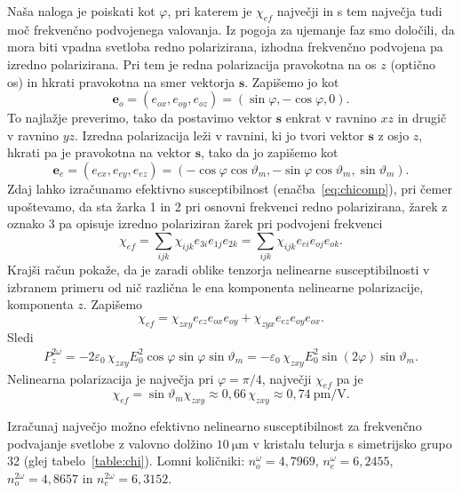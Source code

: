 Naša naloga je poiskati kot $\varphi$, pri katerem je 
$\chi_{ef}$ največji in s tem največja tudi moč frekvenčno podvojenega valovanja.
Iz pogoja za ujemanje faz smo določili, da mora biti vpadna svetloba redno polarizirana, 
izhodna frekvenčno podvojena pa izredno polarizirana. Pri tem je redna polarizacija pravokotna na 
os $z$ (optično os) in hkrati pravokotna na smer vektorja $\mathbf{s}$. Zapišemo jo kot
\begin{equation}
\mathbf{e}_o=(e_{ox}, e_{oy}, e_{oz}) = (\sin\varphi,-\cos\varphi,0).
\label{8.15}
\end{equation}
To najlažje preverimo, tako da postavimo vektor $\mathbf{s}$ enkrat v ravnino $xz$ in
drugič v ravnino $yz$. Izredna polarizacija leži v ravnini, ki jo tvori vektor $\mathbf{s}$ z osjo $z$,
hkrati pa je pravokotna na vektor $\mathbf{s}$, 
tako da jo zapišemo kot 
\begin{equation}
\mathbf{e}_e=(e_{ex}, e_{ey}, e_{ez}) 
=(-\cos \varphi \cos \vartheta_m,-\sin \varphi \cos \vartheta_m ,\sin \vartheta_m).
\label{8.15a}
\end{equation}
Zdaj lahko izračunamo efektivno susceptibilnost (enačba~\ref{eq:chicomp}), 
pri čemer upoštevamo, da sta žarka 1 in 2 pri osnovni frekvenci redno polarizirana, 
žarek z oznako 3 pa opisuje izredno polariziran žarek pri podvojeni frekvenci
\begin{equation}
\chi_{ef} = \sum_{ijk} \chi_{ijk} e_{3i} e_{1j} e_{2k} = \sum_{ijk} \chi_{ijk} e_{ei} e_{oj} e_{ok}.
\end{equation}
Krajši račun pokaže, da je zaradi oblike tenzorja nelinearne susceptibilnosti v izbranem 
primeru od nič različna le ena komponenta nelinearne polarizacije, komponenta $z$. Zapišemo
\begin{equation}
\chi_{ef} = \chi_{zxy} e_{ez} e_{ox} e_{oy} + \chi_{zyx} e_{ez} e_{oy} e_{ox}.
\end{equation}
Sledi
\begin{eqnarray}
P_{z}^{2\omega}=- 2\varepsilon_0\, \chi_{zxy}E_{0}^2\cos\varphi\sin\varphi
\sin\vartheta_m = - \varepsilon_0\, \chi_{zxy}E_{0}^2\sin(2\varphi) \sin\vartheta_m.
\label{8.151}
\end{eqnarray}
Nelinearna polarizacija je največja pri $\varphi=\pi/4$, največji $\chi_{ef}$  pa je 
\begin{equation}
\chi_{ef}= 
\sin\vartheta_m \chi_{zxy} \approx 0,66\, \chi_{zxy} \approx 
0,74~\si{\pico\metre/\volt}.
\label{8.16}
\end{equation}

\begin{definition}
Izračunaj največjo možno efektivno nelinearno susceptibilnost za
frekvenčno podvajanje svetlobe z valovno
dolžino $10~\si{\micro\metre}$ v kristalu telurja s simetrijsko grupo 32 (glej tabelo~\ref{table:chi}). 
Lomni količniki: $n_o^{\omega} = 4,7969$, 
$n_e^{\omega} = 6,2455$, $n_o^{2\omega} = 4,8657$ in $n_e^{2\omega} = 6,3152$.
\end{definition}

